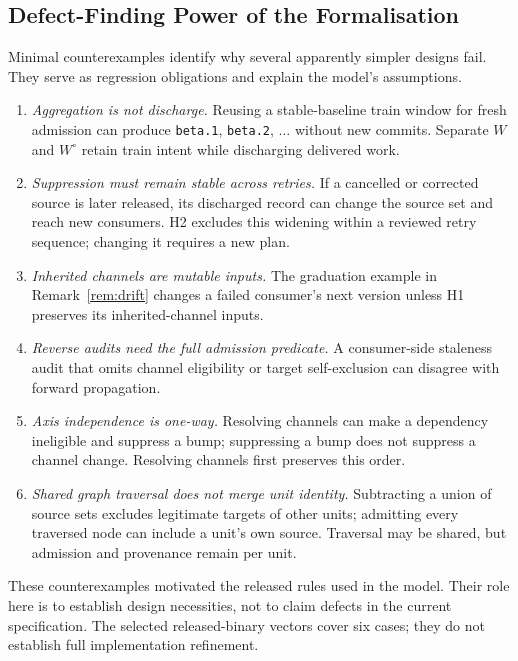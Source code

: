 \documentclass[sigconf,nonacm]{acmart}
\newcommand{\code}[1]{\texttt{#1}}
\begin{document}
\subsection{Defect-Finding Power of the Formalisation}
\label{sec:eval:formal}

Minimal counterexamples identify why several apparently simpler designs fail.
They serve as regression obligations and explain the model's assumptions.

\begin{enumerate}
  \item \emph{Aggregation is not discharge.} Reusing a stable-baseline
    train window for fresh admission can produce \code{beta.1},
    \code{beta.2}, $\ldots$ without new commits. Separate $W$ and
    $W^\circ$ retain train intent while discharging delivered work.
  \item \emph{Suppression must remain stable across retries.} If a
    cancelled or corrected source is later released, its discharged record
    can change the source set and reach new consumers. H2 excludes this
    widening within a reviewed retry sequence; changing it requires a new plan.
  \item \emph{Inherited channels are mutable inputs.} The graduation
    example in Remark~\ref{rem:drift} changes a failed consumer's next version
    unless H1 preserves its inherited-channel inputs.
  \item \emph{Reverse audits need the full admission predicate.} A
    consumer-side staleness audit that omits channel eligibility or target
    self-exclusion can disagree with forward propagation.
  \item \emph{Axis independence is one-way.} Resolving channels can make a
    dependency ineligible and suppress a bump; suppressing a bump does not
    suppress a channel change. Resolving channels first preserves this order.
  \item \emph{Shared graph traversal does not merge unit identity.}
    Subtracting a union of source sets excludes legitimate targets of other
    units; admitting every traversed node can include a unit's own source.
    Traversal may be shared, but admission and provenance remain per unit.
\end{enumerate}

These counterexamples motivated the released rules used in the model. Their
role here is to establish design necessities, not to claim defects in the
current specification. The selected released-binary vectors cover six cases;
they do not establish full implementation refinement.
\end{document}
